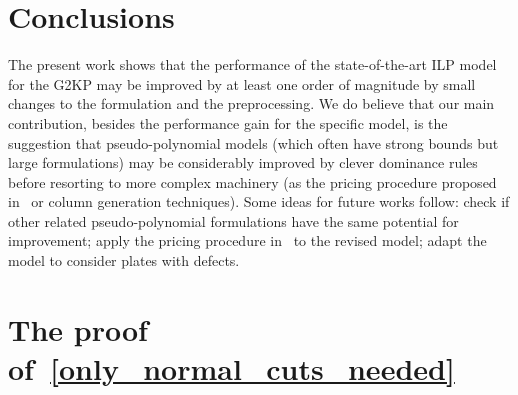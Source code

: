 \documentclass[runningheads]{llncs}
\begin{document}
\section{Conclusions}

The present work shows that the performance of the state-of-the-art ILP model for the G2KP may be improved by at least one order of magnitude by small changes to the formulation and the preprocessing.
We do believe that our main contribution, besides the performance gain for the specific model, is the suggestion that pseudo-polynomial models (which often have strong bounds but large formulations) may be considerably improved by clever dominance rules before resorting to more complex machinery (as the pricing procedure proposed in~\cite{furini:2016} or column generation techniques).
Some ideas for future works follow: check if other related pseudo-polynomial formulations have the same potential for improvement; apply the pricing procedure in~\cite{furini:2016} to the revised model; adapt the model to consider plates with defects.


%



\pagebreak
\appendix

\section{The proof of~\autoref{only_normal_cuts_needed}}
\end{document}

